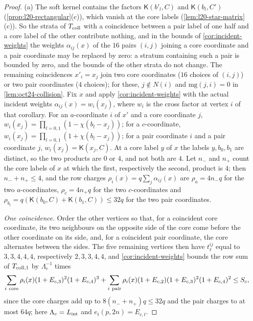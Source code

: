 \begin{proof}
(a) The soft kernel contains the factors $\mathsf K(b'_l,C)$ and
$\mathsf K(b_l,C')$ (\cref{prop:l20-rectangular}(c)), which vanish at the core
labels (\cref{lem:l20-star-matrix}(c)). So the strata of $T_{\rm coll}$ with a
coincidence between a pair label of one half and a core label of the other
contribute nothing, and in the bounds of \cref{cor:incident-weights} the weights
$\alpha_{ij}(x)$ of the $16$ pairs $(i,j)$ joining a core coordinate and a pair
coordinate may be replaced by zero: a stratum containing such a pair is bounded
by zero, and the bounds of the other strata do not change. The remaining
coincidences $x'_i=x_j$ join two core coordinates ($16$ choices of $(i,j)$) or two
pair coordinates ($4$ choices); for these, $j\notin N(i)$ and $\mathrm{mg}(j,i)=0$
in \cref{lem:oct24-collision}. Fix $x$ and apply \cref{cor:incident-weights} with
the actual incident weights $\alpha_{ij}(x)=w_i(x_j)$, where $w_i$ is the
cross factor at vertex $i$ of that corollary. For an $a$-coordinate
$i$ of $x'$ and a core coordinate $j$,
$w_i(x_j)=\prod_{l=0,1}(1-\chi(b_l-x_j))$; for a $c$-coordinate,
$w_i(x_j)=\prod_{l=0,1}(1+\chi(b_l-x_j))$; for a pair coordinate $i$ and a pair
coordinate $j$, $w_i(x_j)=\mathsf K(x_j,C)$. At a core label $y$ of $x$ the
labels $y,b_0,b_1$ are distinct, so the two products are $0$ or $4$, and not
both are $4$. Let $n_-$ and $n_+$ count the core labels of $x$ at which the
first, respectively the second, product is $4$; then $n_-+n_+\le4$, and the row
charges $\rho_i(x)=q\sum_j\alpha_{ij}(x)$ are $\rho_a=4n_-q$ for the two
$a$-coordinates, $\rho_c=4n_+q$ for the two $c$-coordinates and
$\rho_{b_l}=q(\mathsf K(b_0,C)+\mathsf K(b_1,C))\le32q$ for the two pair
coordinates.

\emph{One coincidence.} Order the other vertices so that, for a coincident core
coordinate, its two neighbours on the opposite side of the core come before the
other coordinate on its side, and, for a coincident pair coordinate, the core
alternates between the sides. The five remaining vertices then have
$t^{ij}_\ell$ equal to $3,3,4,4,4$, respectively $2,3,3,4,4$, and
\cref{cor:incident-weights} bounds the row sum of $T_{\rm coll,1}$ by
$\Lambda_c^{-1}$ times
\[
 \sum_{i\ \rm core}\rho_i(x)(1+E_{c,3})^2(1+E_{c,4})^3
 +\sum_{i\ \rm pair}\rho_i(x)(1+E_{c,2})(1+E_{c,3})^2(1+E_{c,4})^2\le S_c,
\]
since the core charges add up to $8(n_-+n_+)q\le32q$ and the pair charges to at
most $64q$; here $\Lambda_c=L_{\rm int}$ and $e_t(p,2n)=E_{c,t}$.


\end{proof}
